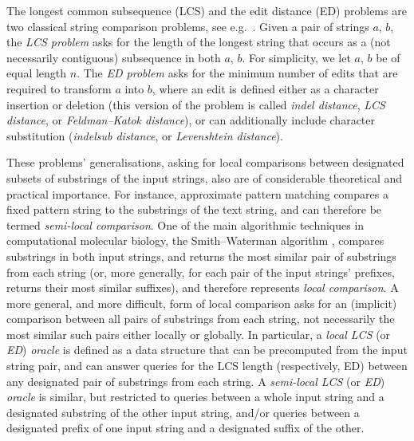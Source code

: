 \documentclass[a4paper,UKenglish,cleveref]{lipics-v2021}
\begin{document}
The longest common subsequence (LCS) and the edit distance (ED) problems 
are two classical string comparison problems, see e.g.\ \cite{xxx}.
Given a pair of strings $a$, $b$, the \emph{LCS problem}
asks for the length of the longest string that occurs 
as a (not necessarily contiguous) subsequence in both $a$, $b$.
For simplicity, we let $a$, $b$ be of equal length $n$.
The \emph{ED problem} asks for the minimum number of edits that are required to transform $a$ into $b$,
where an edit is defined either as a character insertion or deletion 
(this version of the problem is called 
\emph{indel distance}, \emph{LCS distance}, or \emph{Feldman--Katok distance}),
or can additionally include character substitution
(\emph{indelsub distance}, or \emph{Levenshtein distance}).

These problems' generalisations, asking for local comparisons 
between designated subsets of substrings of the input strings,
also are of considerable theoretical and practical importance.
For instance, approximate pattern matching \cite{xxx}
compares a fixed pattern string to the substrings of the text string,
and can therefore be termed \emph{semi-local comparison}.
One of the main algorithmic techniques in computational molecular biology, 
the Smith--Waterman algorithm \cite{xxx},
compares substrings in both input strings, and returns the most similar pair of substrings from each string
(or, more generally, for each pair of the input strings' prefixes, returns their most similar suffixes),
and therefore represents \emph{local comparison}.
A more general, and more difficult, form of local comparison 
asks for an (implicit) comparison between all pairs of substrings from each string,
not necessarily the most similar such pairs either locally or globally.
In particular, a \emph{local LCS} (or \emph{ED}) \emph{oracle} is defined as a data structure
that can be precomputed from the input string pair,
and can answer queries for the LCS length (respectively, ED) 
between any designated pair of substrings from each string.
A \emph{semi-local LCS} (or \emph{ED}) \emph{oracle} is similar,
but restricted to queries between a whole input string and a designated substring of the other input string,
and/or queries between a designated prefix of one input string and a designated suffix of the other.
\end{document}
